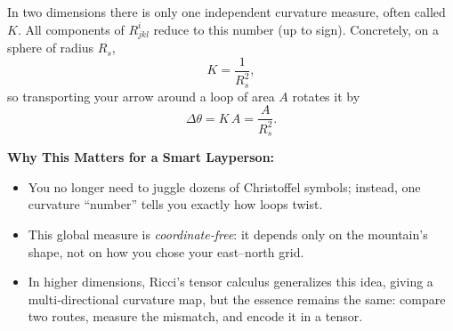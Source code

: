 In two dimensions there is only one independent curvature measure, often called \(K\).  All components of \(R^i_{jkl}\) reduce to this number (up to sign).  Concretely, on a sphere of radius \(R_s\),
\[
K = \frac{1}{R_s^2},
\]
so transporting your arrow around a loop of area \(A\) rotates it by
\[
\Delta\theta = K\,A = \frac{A}{R_s^2}.
\]

\medskip
\noindent\textbf{Why This Matters for a Smart Layperson:}
\begin{itemize}
  \item You no longer need to juggle dozens of Christoffel symbols; instead, one curvature “number” tells you exactly how loops twist.
  \item This global measure is \emph{coordinate‐free}: it depends only on the mountain’s shape, not on how you chose your east–north grid.
  \item In higher dimensions, Ricci’s tensor calculus generalizes this idea, giving a multi‐directional curvature map, but the essence remains the same: compare two routes, measure the mismatch, and encode it in a tensor.
\end{itemize}
